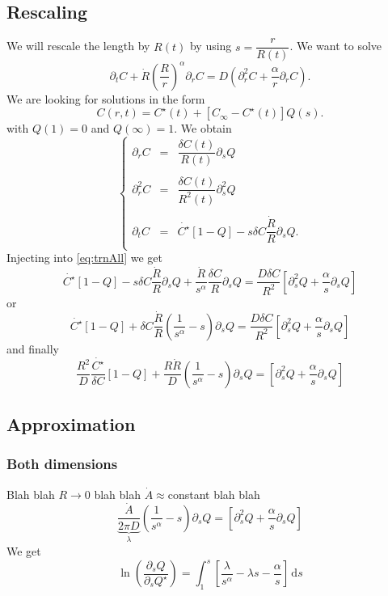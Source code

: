 \documentclass[11pt]{revtex4}
\begin{document}
\subsection{Rescaling}
We will rescale the length by $R(t)$ by using $s=\dfrac{r}{R(t)}$.
We want to solve
\begin{equation}
	\label{eq:trnAll}
	\partial_t C + \dot{R}\left(\dfrac{R}{r}\right)^\alpha \partial_r C = D\left(\partial_r^2 C+ \dfrac{\alpha}{r} \partial_r C \right).
\end{equation}
We are looking for solutions in the form
\begin{equation}
	C(r,t) = C^\star(t) + \left[ C_\infty - C^\star(t)\right] Q(s).
\end{equation}
with $Q(1)=0$ and $Q(\infty)=1$.
We obtain
$$
	\left\lbrace
	\begin{array}{rcl}
	\partial_r C   & = & \dfrac{\delta C(t)}{R(t)}\partial_s Q\\
	\\
	\partial_r^2 C & = & \dfrac{\delta C(t)}{R^2(t)}\partial_s^2 Q\\
	\\
	\partial_t  C  & = & \dot{C^\star}\left[1-Q\right] - s \delta C  \dfrac{\dot{R}}{R} \partial_s Q.\\
	\end{array}
	\right.
$$
Injecting into \eqref{eq:trnAll} we get
$$
	\dot{C^\star}\left[1-Q\right] - s \delta C  \dfrac{\dot{R}}{R} \partial_s Q
	+ \dfrac{\dot{R}}{s^\alpha}  \dfrac{\delta C}{R}\partial_s Q = \dfrac{D\delta C}{R^2}\left[ \partial_s^2 Q + \dfrac{\alpha}{s}\partial_s Q\right]
$$
or
$$
	\dot{C^\star}\left[1-Q\right] + \delta C \dfrac{\dot{R}}{R} \left( \dfrac{1}{s^\alpha} -s \right) \partial_s Q = \dfrac{D\delta C}{R^2}\left[ \partial_s^2 Q + \dfrac{\alpha}{s}\partial_s Q\right]
$$
and finally
\begin{equation}
	\dfrac{R^2}{D} \dfrac{\dot{C^\star}}{\delta C} \left[1-Q\right] + \dfrac{R\dot{R}}{D} \left( \dfrac{1}{s^\alpha} -s \right) \partial_s Q = \left[ \partial_s^2 Q + \dfrac{\alpha}{s}\partial_s Q\right]
\end{equation}

\subsection{Approximation}
\subsubsection{Both dimensions}
Blah blah $R\to0$ blah blah $\dot{A}\approx$constant blah blah
\begin{equation}
	\underbrace{\dfrac{\dot{A}}{2\pi D}}_{\lambda} \left( \dfrac{1}{s^\alpha} -s \right) \partial_s Q = \left[ \partial_s^2 Q + \dfrac{\alpha}{s}\partial_s Q\right]
\end{equation}
We get
\begin{equation}
	\ln \left(\dfrac{\partial_s Q}{\partial_sQ^\star}\right) = \int_1^s \left[\dfrac{\lambda}{s^\alpha} - \lambda s -\dfrac{\alpha}{s}\right] \,\mathrm{d}s
\end{equation}
\end{document}
